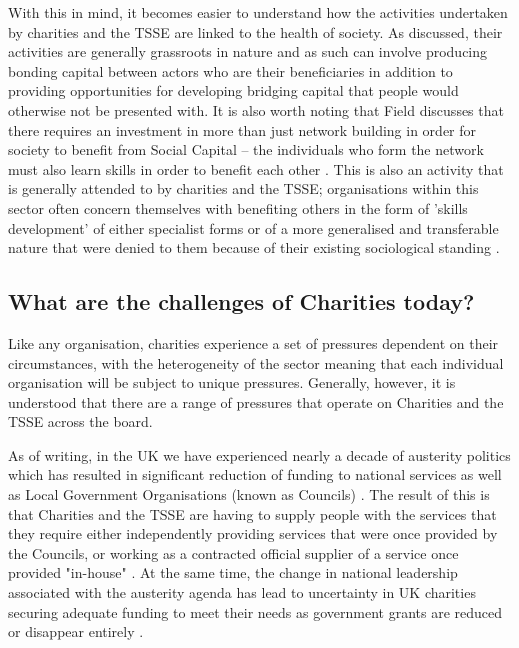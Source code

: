 With this in mind, it becomes easier to understand how the activities undertaken by charities and the TSSE are linked to the health of society. As discussed, their activities are generally grassroots in nature and as such can involve producing bonding capital between actors who are their beneficiaries in addition to providing opportunities for developing bridging capital that people would otherwise not be presented with. It is also worth noting that Field discusses that there requires an investment in more than just network building in order for society to benefit from Social Capital -- the individuals who form the network must also learn skills in order to benefit each other \cite{field_social_2003}. This is also an activity that is generally attended to by charities and the TSSE; organisations within this sector often concern themselves with benefiting others in the form of 'skills development' of either specialist forms or of a more generalised and transferable nature that were denied to them because of their existing sociological standing \cite{anheier_forms_1995}.

\subsection{What are the challenges of Charities today?}
Like any organisation, charities experience a set of pressures dependent on their circumstances, with the heterogeneity of the sector meaning that each individual organisation will be subject to unique pressures. Generally, however, it is understood that there are a range of pressures that operate on Charities and the TSSE across the board.

As of writing, in the UK we have experienced nearly a decade of austerity politics which has resulted in significant reduction of funding to national services as well as Local Government Organisations (known as Councils) \cite{reeves_austere_2013, lowndes_local_2016}. The result of this is that Charities and the TSSE are having to supply people with the services that they require either independently providing services that were once provided by the Councils, or working as a contracted official supplier of a service once provided "in-house" . At the same time, the change in national leadership associated with the austerity agenda has lead to uncertainty in UK charities securing adequate funding to meet their needs as government grants are reduced or disappear entirely .

